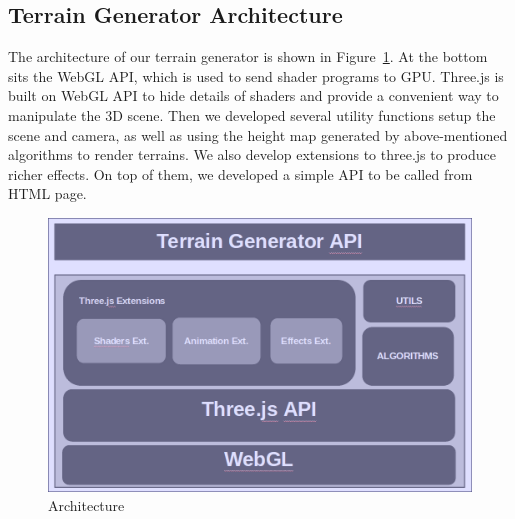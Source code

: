 \subsection{Terrain Generator Architecture}
The architecture of our terrain generator is shown in Figure~\ref{fig:arch}. At the bottom sits the WebGL API, which is used to send shader programs to GPU. Three.js is built on WebGL API to hide details of shaders and provide a convenient way to manipulate the 3D scene. Then we developed several utility functions setup the scene and camera, as well as using the height map generated by above-mentioned algorithms to render terrains. We also develop extensions to three.js to produce richer effects. On top of them, we developed a simple API to be called from HTML page.
\begin{figure}
	\center
	\includegraphics[scale=0.45]{arch.png}
	\caption{Architecture}
	\label{fig:arch}
\end{figure}

